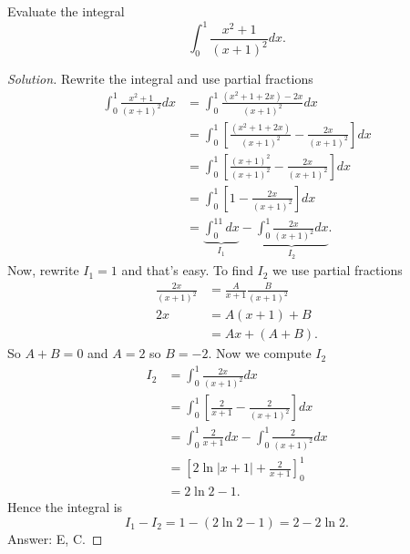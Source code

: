 \begin{problem}
Evaluate the integral
\[
\int_0^1\frac{x^2+1}{(x+1)^2}dx.
\]
\end{problem}
\begin{proof}[Solution]
Rewrite the integral and use partial fractions
\begin{align*}
\int_0^1\frac{x^2+1}{(x+1)^2}dx
&=\int_0^1\frac{(x^2+1+2x)-2x}{(x+1)^2}dx\\
&=\int_0^1\left[\frac{(x^2+1+2x)}{(x+1)^2}-\frac{2x}{(x+1)^2}\right]dx\\
&=\int_0^1\left[\frac{(x+1)^2}{(x+1)^2}-\frac{2x}{(x+1)^2}\right]dx\\
&=\int_0^1\left[1-\frac{2x}{(x+1)^2}\right]dx\\
&=\underbrace{\int_0^11dx}_{I_1}-\underbrace{\int_0^1\frac{2x}{(x+1)^2}dx}_{I_2}.
\end{align*}
Now, rewrite $I_1=1$ and that's easy. To find $I_2$ we use partial
fractions
\begin{align*}
\frac{2x}{(x+1)^2}&=\frac{A}{x+1}\frac{B}{(x+1)^2}\\
2x&=A(x+1)+B\\
 &=Ax+(A+B).
\end{align*}
So $A+B=0$ and $A=2$ so $B=-2$. Now we compute $I_2$
\begin{align*}
I_2&=\int_0^1\frac{2x}{(x+1)^2}dx\\
   &=\int_0^1\left[\frac{2}{x+1}-\frac{2}{(x+1)^2}\right]dx\\
   &=\int_0^1\frac{2}{x+1}dx-\int_0^1\frac{2}{(x+1)^2}dx\\
   &=\left[2\ln|x+1|+\frac{2}{x+1}\right]_0^1\\
   &=2\ln 2-1.
\end{align*}
Hence the integral is
\[
I_1-I_2=1-(2\ln 2-1)=\boxed{2-2\ln 2.}
\]
Answer: {\color{Red} E}, {\color{Green} C}.
\end{proof}

